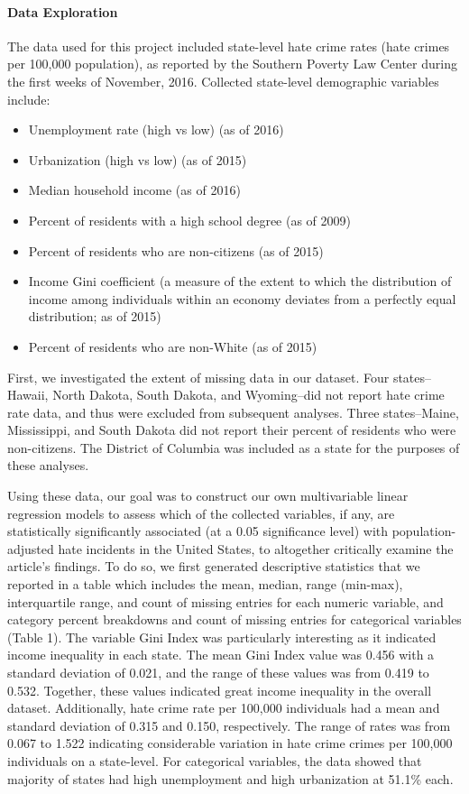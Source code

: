 \documentclass[
]{article}
\providecommand{\tightlist}{%
  \setlength{\itemsep}{0pt}\setlength{\parskip}{0pt}}
\begin{document}
\hypertarget{data-exploration}{%
\paragraph{Data Exploration}\label{data-exploration}}

The data used for this project included state-level hate crime rates
(hate crimes per 100,000 population), as reported by the Southern
Poverty Law Center during the first weeks of November, 2016. Collected
state-level demographic variables include:

\begin{itemize}
\tightlist
\item
  Unemployment rate (high vs low) (as of 2016)
\item
  Urbanization (high vs low) (as of 2015)
\item
  Median household income (as of 2016)
\item
  Percent of residents with a high school degree (as of 2009)
\item
  Percent of residents who are non-citizens (as of 2015)
\item
  Income Gini coefficient (a measure of the extent to which the
  distribution of income among individuals within an economy deviates
  from a perfectly equal distribution; as of 2015)
\item
  Percent of residents who are non-White (as of 2015)
\end{itemize}

First, we investigated the extent of missing data in our dataset. Four
states--Hawaii, North Dakota, South Dakota, and Wyoming--did not report
hate crime rate data, and thus were excluded from subsequent analyses.
Three states--Maine, Mississippi, and South Dakota did not report their
percent of residents who were non-citizens. The District of Columbia was
included as a state for the purposes of these analyses.

Using these data, our goal was to construct our own multivariable linear
regression models to assess which of the collected variables, if any,
are statistically significantly associated (at a 0.05 significance
level) with population-adjusted hate incidents in the United States, to
altogether critically examine the article's findings. To do so, we first
generated descriptive statistics that we reported in a table which
includes the mean, median, range (min-max), interquartile range, and
count of missing entries for each numeric variable, and category percent
breakdowns and count of missing entries for categorical variables (Table
1). The variable Gini Index was particularly interesting as it indicated
income inequality in each state. The mean Gini Index value was 0.456
with a standard deviation of 0.021, and the range of these values was
from 0.419 to 0.532. Together, these values indicated great income
inequality in the overall dataset. Additionally, hate crime rate per
100,000 individuals had a mean and standard deviation of 0.315 and
0.150, respectively. The range of rates was from 0.067 to 1.522
indicating considerable variation in hate crime crimes per 100,000
individuals on a state-level. For categorical variables, the data showed
that majority of states had high unemployment and high urbanization at
51.1\% each.
\end{document}
